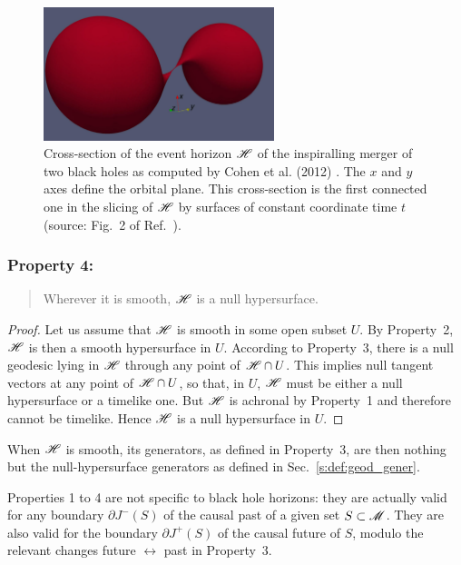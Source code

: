 \begin{figure}
\centerline{\includegraphics[width=0.6\textwidth]{glo_EH_binspir.jpg}}
\caption[]{\label{f:glo:EH_binspir} \footnotesize
Cross-section of the event horizon $\mathscr{H}$ of the inspiralling merger of
two black holes as computed by Cohen et al. (2012) \cite{CohenKS12}.
The $x$ and $y$ axes define the orbital plane.
This cross-section is the first connected one in the slicing of $\mathscr{H}$
by surfaces of constant coordinate time $t$ (source: Fig.~2 of Ref.~\cite{CohenKS12}).}
\end{figure}




\subsubsection{Property 4:}
\begin{quote}
Wherever it is smooth, $\mathscr{H}$ is a null hypersurface.
\end{quote}
\begin{proof}
Let us assume that $\mathscr{H}$ is smooth in some open subset $U$.
By Property~2, $\mathscr{H}$ is then a smooth hypersurface in $U$.
According to Property~3, there is a null geodesic lying in $\mathscr{H}$ through
any point of $\mathscr{H}\cap U$.
This implies null tangent vectors at any point of $\mathscr{H}\cap U$, so that, in $U$,
$\mathscr{H}$ must be either a null hypersurface or a timelike one. But $\mathscr{H}$ is achronal by Property~1 and therefore cannot be timelike. Hence $\mathscr{H}$ is a null hypersurface in $U$.
\end{proof}
When $\mathscr{H}$ is smooth, its generators,
as defined in Property~3, are then nothing but the
null-hypersurface generators as defined in Sec.~\ref{s:def:geod_gener}.

\begin{remark}
Properties 1 to 4 are not specific to black hole horizons: they are actually
valid for any boundary $\partial J^-(S)$ of the causal past of a given set $S\subset\mathscr{M}$.
They are also valid for the boundary $\partial J^+(S)$ of the causal future of
$S$, modulo the relevant changes future $\leftrightarrow$ past in Property~3.
\end{remark}

